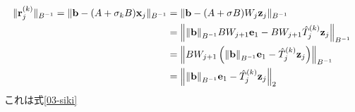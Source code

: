 

\begin{align}
	\|\vb{r}_{j}^{(k)}\|_{B^{-1}} = \|\vb{b} - (A + \sigma_{k}B)\vb{x}_{j}\|_{B^{-1}}
		&= \|\vb{b} - (A + \sigma B)W_{j}\vb{z}_{j} \|_{B^{-1}} \notag \\
		&= \left\| \norm{\vb{b}}_{B^{-1}}BW_{j+1}\vb{e}_{1} - BW_{j+1}\hat{T}_{j}^{(k)} \vb{z}_{j} \right\|_{B^{-1}} \notag \\
		&= \left\| BW_{j+1} \left( \norm{\vb{b}}_{B^{-1}}\vb{e}_1 - \hat{T}_{j}^{(k)} \vb{z}_{j} \right) \right\|_{B^{-1}} \notag \\
		&= \left\| \norm{\vb{b}}_{B^{-1}}\vb{e}_1 - \hat{T}_{j}^{(k)} \vb{z}_{j} \right\|_2
		\label{residual}
\end{align}
これは式\eqref{03-siki}